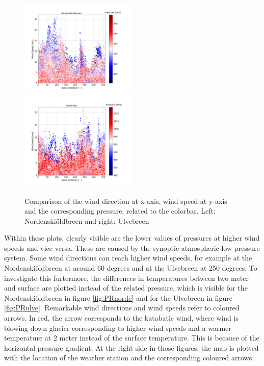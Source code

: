 \documentclass[11pt]{report}
\begin{document}
\begin{figure}[h]
\includegraphics[scale=1, width=0.5\textwidth]{WD-WS-PR-Nordenskioldbreen.png}
\includegraphics[scale=1, width=0.5\textwidth]{WD-WS-PR-Ulvebreen.png}
\caption{Comparison of the wind direction at x-axis, wind speed at y-axis and the corresponding pressure, related to the colorbar. Left: Nordenski\H{o}ldbreen and right: Ulvebreen}
\label{fig:PR}
\end{figure}

Within these plots, clearly visible are the lower values of pressures at higher wind speeds and vice versa. These are caused by the synoptic atmospheric low pressure system. Some wind directions can reach higher wind speeds, for example at the Nordenski\H{o}ldbreen at around 60 degrees and at the Ulvebreen at 250 degrees. To investigate this furtermore, the differences in temperatures between two meter and surface are plotted instead of the related pressure, which is visible for the Nordenski\H{o}ldbreen in figure \ref{fig:PRnorde} and for the Ulvebreen in figure \ref{fig:PRulve}. Remarkable wind directions and wind speeds refer to coloured arrows. In red, the arrow corresponds to the katabatic wind, where wind is blowing down glacier corresponding to higher wind speeds and a warmer temperature at 2 meter instead of the surface temperature. This is because of the horizontal pressure gradient. At the right side in those figures, the map is plotted with the location of the weather station and the corresponding coloured arrows. 
\end{document}

